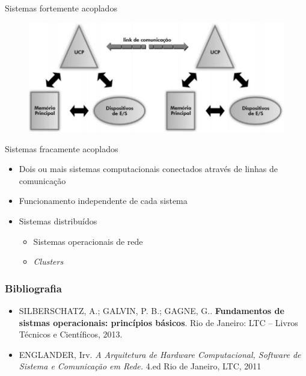 \documentclass[aspectratio=169,
				xcolor=table]{beamer}
\begin{document}
	\begin{frame}{Sistemas fortemente acoplados}	
		\begin{figure}[hbtp]
			\centering
			\includegraphics[width=.85\textwidth, keepaspectratio]{../figs/cap01/fracamenteAcoplado.png}
		\end{figure}
	\end{frame}
	
	\begin{frame}{Sistemas fracamente acoplados}
		\begin{itemize}
			\item Dois ou mais sistemas computacionais conectados através de linhas de comunicação
			\item Funcionamento independente de cada sistema
			\item Sistemas distribuídos
			\begin{itemize}
				\item Sistemas operacionais de rede
				\item \textit{Clusters}
			\end{itemize}
		\end{itemize}
	\end{frame}

		
	\begin{frame}
		\frametitle{Bibliografia}
		\begin{itemize}
			\item SILBERSCHATZ, A.; GALVIN, P. B.; GAGNE, G.. \textbf{Fundamentos de sistmas operacionais: princípios básicos}. Rio de Janeiro: LTC – Livros Técnicos e Científicos, 2013.


			\item ENGLANDER, Irv. \textit{A Arquitetura de Hardware Computacional, Software de Sistema e Comunicação em Rede.} 4.ed Rio de Janeiro, LTC, 2011

		\end{itemize}
	\end{frame}
	
	\begin{frame}{}
		
	\end{frame}
	
\end{document}

